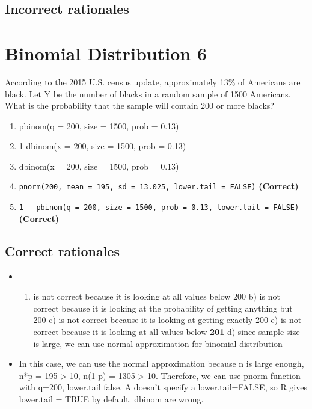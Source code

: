 \documentclass[letterpaper,9pt,twoside,printwatermark=false]{pinp}
\providecommand{\tightlist}{%
  \setlength{\itemsep}{0pt}\setlength{\parskip}{0pt}}
\begin{document}
\subsection{Incorrect rationales}\label{incorrect-rationales-4}

\section{Binomial Distribution 6}\label{binomial-distribution-6}

According to the 2015 U.S. census update, approximately 13\% of
Americans are black. Let Y be the number of blacks in a random sample of
1500 Americans. What is the probability that the sample will contain 200
or more blacks?

\begin{enumerate}
\def\labelenumi{\alph{enumi}.}
\tightlist
\item
  pbinom(q = 200, size = 1500, prob = 0.13)
\item
  1-dbinom(x = 200, size = 1500, prob = 0.13)
\item
  dbinom(x = 200, size = 1500, prob = 0.13)
\item
  \texttt{pnorm(200, mean = 195, sd = 13.025, lower.tail = FALSE)}
  \textbf{(Correct)}
\item
  \texttt{1 - pbinom(q = 200, size = 1500, prob = 0.13, lower.tail = FALSE)}
  \textbf{(Correct)}
\end{enumerate}

\subsection{Correct rationales}\label{correct-rationales-5}

\begin{itemize}
\item
  \begin{enumerate}
  \def\labelenumi{\alph{enumi})}
  \tightlist
  \item
    is not correct because it is looking at all values below 200 b) is
    not correct because it is looking at the probability of getting
    anything but 200 c) is not correct because it is looking at getting
    exactly 200 e) is not correct because it is looking at all values
    below \textbf{201} d) since sample size is large, we can use normal
    approximation for binomial distribution
  \end{enumerate}
\item
  In this case, we can use the normal approximation because n is large
  enough, n*p = 195 \textgreater{} 10, n(1-p) = 1305 \textgreater{} 10.
  Therefore, we can use pnorm function with q=200, lower.tail false. A
  doesn't specify a lower.tail=FALSE, so R gives lower.tail = TRUE by
  default. dbinom are wrong.
\end{itemize}
\end{document}
